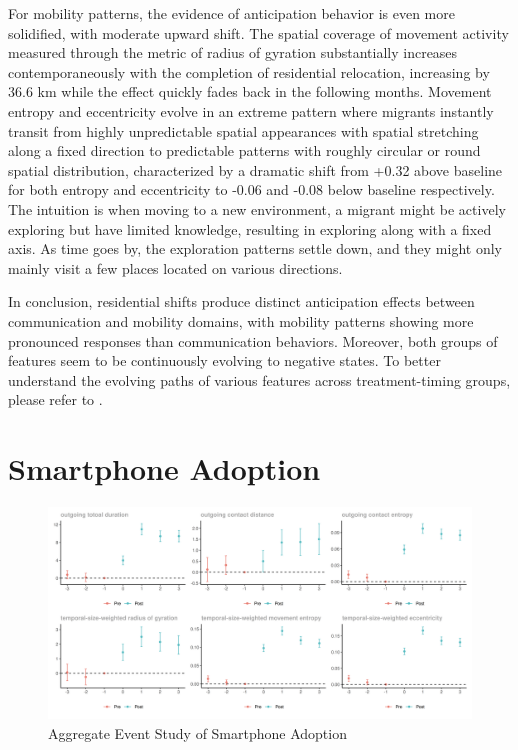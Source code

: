 For mobility patterns, the evidence of anticipation behavior is even more solidified, with moderate upward shift. The spatial coverage of movement activity measured through the metric of radius of gyration substantially increases contemporaneously with the completion of residential relocation, increasing by 36.6 km while the effect quickly fades back in the following months. Movement entropy and eccentricity evolve in an extreme pattern where migrants instantly transit from highly unpredictable spatial appearances with spatial stretching along a fixed direction to predictable patterns with roughly circular or round spatial distribution, characterized by a dramatic shift from +0.32 above baseline for both entropy and eccentricity to -0.06 and -0.08 below baseline respectively. The intuition is when moving to a new environment, a migrant might be actively exploring but have limited knowledge, resulting in exploring along with a fixed axis. As time goes by, the exploration patterns settle down, and they might only mainly visit a few places located on various directions.

In conclusion, residential shifts produce distinct anticipation effects between communication and mobility domains, with mobility patterns showing more pronounced responses than communication behaviors. Moreover, both groups of features seem to be continuously evolving to negative states. To better understand the evolving paths of various features across treatment-timing groups, please refer to .

\clearpage\newpage
\section{Smartphone Adoption}
\begin{figure}[h!]
\centering
\caption{Aggregate Event Study of Smartphone Adoption}
\vspace{0.1cm}

\includegraphics[scale=0.49]{figures/csdid/smartphone_adoption.png}

\label{fig:event_study_smartphone_adoption}
\end{figure}

